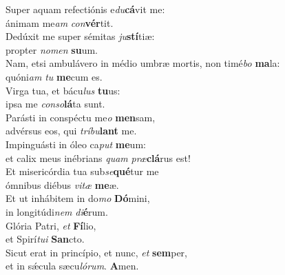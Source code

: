 \evenverse Super aquam refectiónis e\textit{du}\textbf{cá}vit me:~\*\\
\evenverse ánimam me\textit{am} \textit{con}\textbf{vér}tit.\\
\oddverse Dedúxit me super sémitas \textit{ju}\textbf{stí}tiæ:~\*\\
\oddverse propter \textit{no}\textit{men} \textbf{su}um.\\
\evenverse Nam, etsi ambulávero in médio umbræ mortis, non timé\textit{bo} \textbf{ma}la:~\*\\
\evenverse quóni\textit{am} \textit{tu} \textbf{me}cum es.\\
\oddverse Virga tua, et bácu\textit{lus} \textbf{tu}us:~\*\\
\oddverse ipsa me \textit{con}\textit{so}\textbf{lá}ta sunt.\\
\evenverse Parásti in conspéctu me\textit{o} \textbf{men}sam,~\*\\
\evenverse advérsus eos, qui \textit{trí}\textit{bu}\textbf{lant} me.\\
\oddverse Impinguásti in óleo ca\textit{put} \textbf{me}um:~\*\\
\oddverse et calix meus inébrians \textit{quam} \textit{præ}\textbf{clá}rus est!\\
\evenverse Et misericórdia tua sub\textit{se}\textbf{qué}tur me~\*\\
\evenverse ómnibus diébus \textit{vi}\textit{tæ} \textbf{me}æ.\\
\oddverse Et ut inhábitem in do\textit{mo} \textbf{Dó}mini,~\*\\
\oddverse in longitúdi\textit{nem} \textit{di}\textbf{é}rum.\\
\evenverse Glória Patri, \textit{et} \textbf{Fí}lio,~\*\\
\evenverse et Spirí\textit{tu}\textit{i} \textbf{San}cto.\\
\oddverse Sicut erat in princípio, et nunc, \textit{et} \textbf{sem}per,~\*\\
\oddverse et in sǽcula sæcu\textit{ló}\textit{rum}. \textbf{A}men.\\
